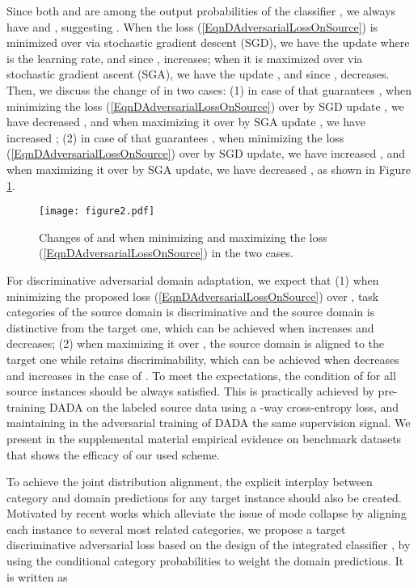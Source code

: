 \documentclass[letterpaper]{article} \usepackage{aaai20}  \usepackage{times}  \usepackage{helvet} \usepackage{courier}  \usepackage[hyphens]{url}  \usepackage{graphicx} \urlstyle{rm} \def\UrlFont{\rm}  \usepackage{graphicx}  \frenchspacing  \setlength{\pdfpagewidth}{8.5in}  \setlength{\pdfpageheight}{11in}
\begin{document}
Since both  and  are among the  output probabilities of the classifier , we always have  and , suggesting . When the loss (\ref{EqnDAdversarialLossOnSource}) is minimized over  via stochastic gradient descent (SGD), we have the update  where  is the learning rate, and since ,  increases; when it is maximized over  via stochastic gradient ascent (SGA), we have the update , and since ,   decreases. Then, we discuss the change of  in two cases: (1) in case of  that guarantees , when minimizing the loss (\ref{EqnDAdversarialLossOnSource}) over  by SGD update , we have decreased , and when maximizing it over  by SGA update , we have increased ; (2) in case of  that guarantees , when minimizing the loss (\ref{EqnDAdversarialLossOnSource}) over  by SGD update, we have increased , and when maximizing it over  by SGA update, we have decreased , as shown in Figure \ref{fig:see_change}.

\begin{figure}[!ht]
	\centering
	\texttt{[image: figure2.pdf]}
	\caption{Changes of  and  when minimizing and maximizing the loss (\ref{EqnDAdversarialLossOnSource}) in the two cases.}
	\label{fig:see_change}
\end{figure}

For discriminative adversarial domain adaptation, we expect that (1) when minimizing the proposed loss (\ref{EqnDAdversarialLossOnSource}) over , task categories of the source domain is discriminative and the source domain is distinctive from the target one, which can be achieved when  increases and  decreases; (2) when maximizing it over , the source domain is aligned to the target one while retains discriminability, which can be achieved when  decreases and  increases in the case of . To meet the expectations, the condition of  for all source instances should be always satisfied. This is practically achieved by pre-training DADA on the labeled source data using a -way cross-entropy loss, and maintaining in the adversarial training of DADA the same supervision signal. We present in the supplemental material empirical evidence on benchmark datasets that shows the efficacy of our used scheme. 

To achieve the joint distribution alignment, the explicit interplay between category and domain predictions for any target instance should also be created. Motivated by recent works \cite{mada,cdan} which alleviate the issue of mode collapse by aligning each instance to several most related categories, we propose a target discriminative adversarial loss based on the design of the integrated classifier , by using the conditional category probabilities to weight the domain predictions. It is written as 
\end{document}
